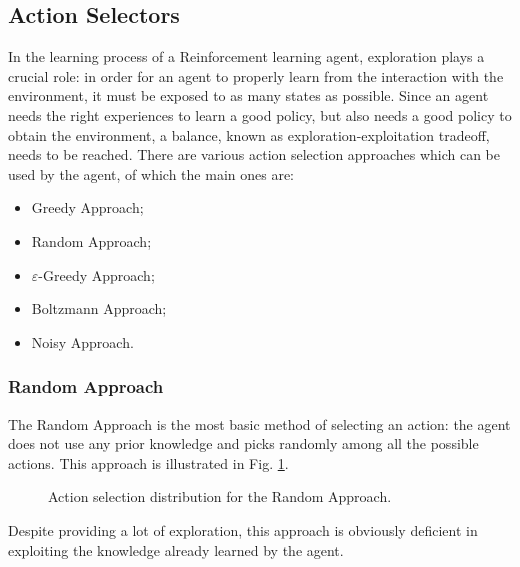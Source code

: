 \documentclass[a4paper, 12pt]{article}
\numberwithin{equation}{section}
\begin{document}
\subsection[Action Selectors]{Action Selectors \cite{action-selectors}}
In the learning process of a Reinforcement learning agent, exploration plays a crucial role: in order for an agent to properly learn from the interaction with the environment, it must be exposed to as many states as possible. Since an agent needs the right experiences to learn a good policy, but also needs a good policy to obtain the environment, a balance, known as exploration-exploitation tradeoff, needs to be reached. There are various action selection approaches which can be used by the agent, of which the main ones are:
\begin{itemize}
	\item Greedy Approach;
	\item Random Approach;
	\item $\varepsilon$-Greedy Approach;
	\item Boltzmann Approach;
	\item Noisy Approach.
\end{itemize}


\subsubsection{Random Approach}

The Random Approach is the most basic method of selecting an action: the agent does not use any prior knowledge and picks randomly among all the possible actions. This approach is illustrated in Fig. \ref{fig:random}.

\begin{figure}[h]
	\centering
		\caption{Action selection distribution for the Random Approach.}
	\label{fig:random}
\end{figure}

Despite providing a lot of exploration, this approach is obviously deficient in exploiting the knowledge already learned by the agent.
\end{document}
